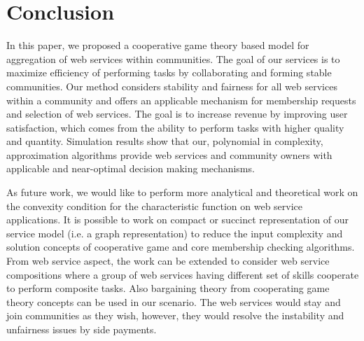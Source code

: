 \documentclass[10pt, conference, compsocconf]{IEEEtran}
\theoremstyle{plain}
\theoremstyle{definition}
\begin{document}
\section{Conclusion}\label{s:conclusion}

In this paper, we proposed a cooperative game theory based model for aggregation of web services within communities. The goal of our services is to maximize efficiency of performing tasks by collaborating and forming stable communities. Our method considers stability and fairness for all web services within a community and offers an applicable mechanism for membership requests and selection of web services. The goal is to increase revenue by improving user satisfaction, which comes from the ability to perform tasks with higher quality and quantity. Simulation results show that our, polynomial in complexity, approximation algorithms provide web services and community owners with applicable and near-optimal decision making mechanisms. 

As future work, we would like to perform more analytical and theoretical work on the convexity condition for the characteristic function on web service applications. It is possible to work on compact or succinct representation of our service model (i.e. a graph representation) to reduce the input complexity and solution concepts of cooperative game and core membership checking algorithms. From web service aspect, the work can be extended to consider web service compositions where a group of web services having different set of skills cooperate to perform composite tasks. Also bargaining theory from cooperating game theory concepts can be used in our scenario. The web services would stay and join communities as they wish, however, they would resolve the instability and unfairness issues by side payments.







%
%
\end{document}
